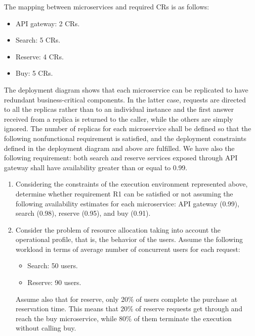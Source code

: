 The mapping between microservices and required CRs is as follows:
\begin{itemize}
    \item API gateway: 2 CRs.
    \item Search: 5 CRs.
    \item Reserve: 4 CRs.
    \item Buy: 5 CRs.
\end{itemize}
The deployment diagram shows that each microservice can be replicated to have redundant business-critical components. 
In the latter case, requests are directed to all the replicas rather than to an individual instance and the first answer received from a replica is returned to the caller, while the others are simply ignored. 
The number of replicas for each microservice shall be defined so that the following nonfunctional requirement is satisfied, and the deployment constraints defined in the deployment diagram and above are fulfilled.
We have also the following requirement: both search and reserve services exposed through API gateway shall have availability greater than or equal to 0.99. 
\begin{enumerate}
    \item Considering the constraints of the execution environment represented above, determine whether requirement R1 can be satisfied or not assuming the following availability estimates for each microservice: API gateway (0.99), search (0.98), reserve (0.95), and buy (0.91).
    \item Consider the problem of resource allocation taking into account the operational profile, that is, the behavior of the users. 
        Assume the following workload in terms of average number of concurrent users for each request:
        \begin{itemize}
            \item Search: 50 users. 
            \item Reserve: 90 users. 
        \end{itemize}
        Assume also that for reserve, only 20$\%$ of users complete the purchase at reservation time. This means that 20$\%$ of reserve requests get through and reach the buy microservice, while 80$\%$ of them terminate the execution without calling buy.
\end{enumerate}

